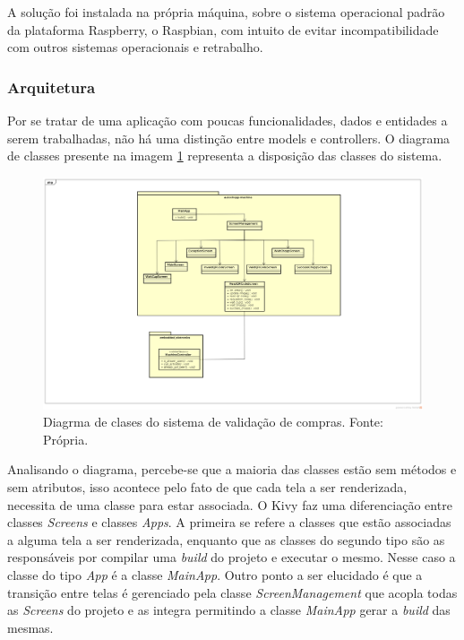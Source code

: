         A solução foi instalada na própria máquina, sobre o sistema operacional padrão
        da plataforma Raspberry, o Raspbian, com intuito de evitar incompatibilidade com outros
        sistemas operacionais e retrabalho.

         \subsubsection[Arquitetura]{Arquitetura}
            Por se tratar de uma aplicação com poucas funcionalidades, dados e entidades a serem trabalhadas,
            não há uma distinção entre models e controllers. O diagrama de classes presente na imagem 
            \ref{classes-kivy} representa a disposição das classes do sistema.
            
            \begin{figure}[!htb]
                \centering
                \includegraphics[scale= 0.3]{figuras/autochopp-machine-diagrama.png}        
                \caption{Diagrma de clases do sistema de validação de compras. Fonte: Própria.}
                \label{classes-kivy}
            \end{figure}
            
            Analisando o diagrama, percebe-se que a maioria das classes estão sem métodos e sem atributos,
            isso acontece pelo fato de que cada tela a ser renderizada, necessita de uma classe para estar
            associada. O Kivy faz uma diferenciação entre classes \textit{Screens} e classes \textit{Apps}.
            A primeira se refere a classes que estão associadas a alguma tela a ser renderizada, enquanto
            que as classes do segundo tipo são as responsáveis por compilar uma \textit{build} do projeto
            e executar o mesmo. Nesse caso a classe do tipo \textit{App} é a classe \textit{MainApp}. Outro
            ponto a ser elucidado é que a transição entre telas é gerenciado pela classe
            \textit{ScreenManagement} que acopla todas as \textit{Screens} do projeto e as integra permitindo
            a classe \textit{MainApp} gerar a \textit{build} das mesmas.

